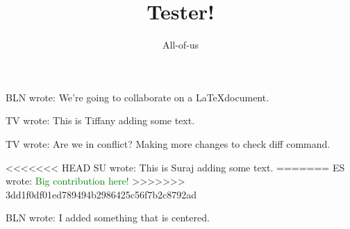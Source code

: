 \documentclass[12pt]{article}
\title{Tester!}
\author{All-of-us}
\newcommand{\bln}[1]{BLN wrote: \textcolor{red!70!blue!70}{#1}}
\newcommand{\tv}[1]{TV wrote: \textcolor{blue!70}{#1}}
\newcommand{\su}[1]{SU wrote: \textcolor{green!70}{#1}}
\newcommand{\es}[1]{ES wrote: \textcolor{green}{#1}}
\begin{document}
\maketitle

\bln{We're going to collaborate on a \LaTeX document.}

\tv{This is Tiffany adding some text.}

\tv{Are we in conflict? Making more changes to check diff command.}

<<<<<<< HEAD
\su{This is Suraj adding some text.}
=======
\es{Big contribution here!}
>>>>>>> 3dd1f0df01ed789494b2986425c56f7b2c8792ad

\begin{center}
  \bln{I added something that is centered.}
\end{center}
\end{document}
